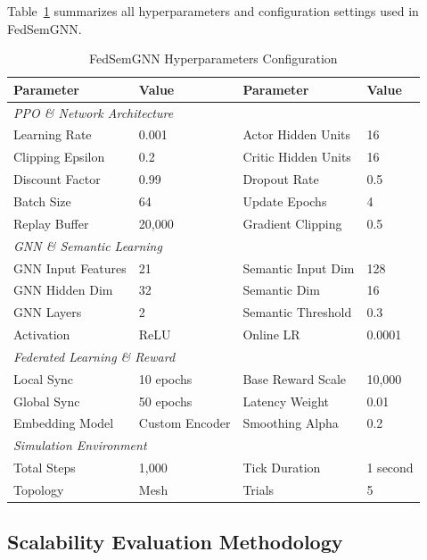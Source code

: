 \documentclass[conference]{IEEEtran}
\begin{document}
	Table~\ref{tab:hyperparameters} summarizes all hyperparameters and configuration settings used in FedSemGNN.
	
	\begin{table}[t]
		\centering
		\caption{FedSemGNN Hyperparameters Configuration}
		\label{tab:hyperparameters}
		\scriptsize
		\begin{tabular}{@{}llll@{}}
			\toprule
			\textbf{Parameter} & \textbf{Value} & \textbf{Parameter} & \textbf{Value} \\
			\midrule
			\multicolumn{4}{l}{\textit{PPO \& Network Architecture}} \\
			Learning Rate & 0.001 & Actor Hidden Units & 16 \\
			Clipping Epsilon & 0.2 & Critic Hidden Units & 16 \\
			Discount Factor & 0.99 & Dropout Rate & 0.5 \\
			Batch Size & 64 & Update Epochs & 4 \\
			Replay Buffer & 20,000 & Gradient Clipping & 0.5 \\
			\midrule
			\multicolumn{4}{l}{\textit{GNN \& Semantic Learning}} \\
			GNN Input Features & 21 & Semantic Input Dim & 128 \\
			GNN Hidden Dim & 32 & Semantic Dim & 16 \\
			GNN Layers & 2 & Semantic Threshold & 0.3 \\
			Activation & ReLU & Online LR & 0.0001 \\
			\midrule
			\multicolumn{4}{l}{\textit{Federated Learning \& Reward}} \\
			Local Sync & 10 epochs & Base Reward Scale & 10,000 \\
			Global Sync & 50 epochs & Latency Weight & 0.01 \\
			Embedding Model & Custom Encoder & Smoothing Alpha & 0.2 \\
			\midrule
			\multicolumn{4}{l}{\textit{Simulation Environment}} \\
			Total Steps & 1,000 & Tick Duration & 1 second \\
			Topology & Mesh & Trials & 5 \\
			\bottomrule
		\end{tabular}
	\end{table}
	
	\subsection{Scalability Evaluation Methodology}
	
\end{document}
